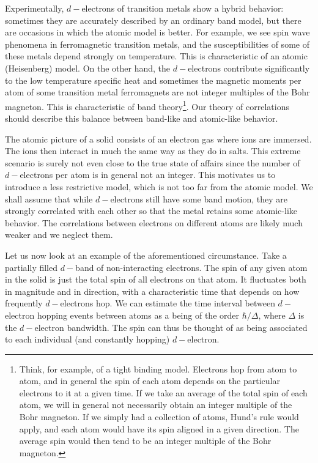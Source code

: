 Experimentally, $d-$electrons of transition metals show a hybrid behavior: sometimes they are accurately described by an ordinary band model, but there are occasions in which the atomic model is better.
For example, we see spin wave phenomena in ferromagnetic transition metals, and the susceptibilities of some of these metals depend strongly on temperature.
This is characteristic of an atomic (Heisenberg) model.
On the other hand, the $d-$electrons contribute significantly to the low temperature specific heat and sometimes the magnetic moments per atom of some transition metal ferromagnets are not integer multiples of the Bohr magneton.
This is characteristic of band theory\footnote{Think, for example, of a tight binding model. Electrons hop from atom to atom, and in general the spin of each atom depends on the particular electrons  to it at a given time. If we take an average of the total spin of each atom, we will in general not necessarily obtain an integer multiple of the Bohr magneton. If we simply had a collection of atoms, Hund's rule would apply, and each atom would have its spin aligned in a given direction. The average spin would then tend to be an integer multiple of the Bohr magneton.}.
Our theory of correlations should describe this balance between band-like and atomic-like behavior.

The atomic picture of a solid consists of an electron gas where ions are immersed.
The ions then interact in much the same way as they do in salts.
This extreme scenario is surely not even close to the true state of affairs since the number of $d-$electrons per atom is in general not an integer.
This motivates us to introduce a less restrictive model, which is not too far from the atomic model.
We shall assume that while $d-$electrons still have some band motion, they are strongly correlated with each other so that the metal retains some atomic-like behavior.
The correlations between electrons on different atoms are likely much weaker and we neglect them.

Let us now look at an example of the aforementioned circumstance.
Take a partially filled $d-$band of non-interacting electrons.
The spin of any given atom in the solid is just the total spin of all electrons on that atom.
It fluctuates both in magnitude and in direction, with a characteristic time that depends on how frequently $d-$electrons hop.
We can estimate the time interval between $d-$electron hopping events between atoms as a being of the order $\hbar / \Delta$, where $\Delta$ is the $d-$electron bandwidth.
The spin can thus be thought of as being associated to each individual (and constantly hopping) $d-$electron.

